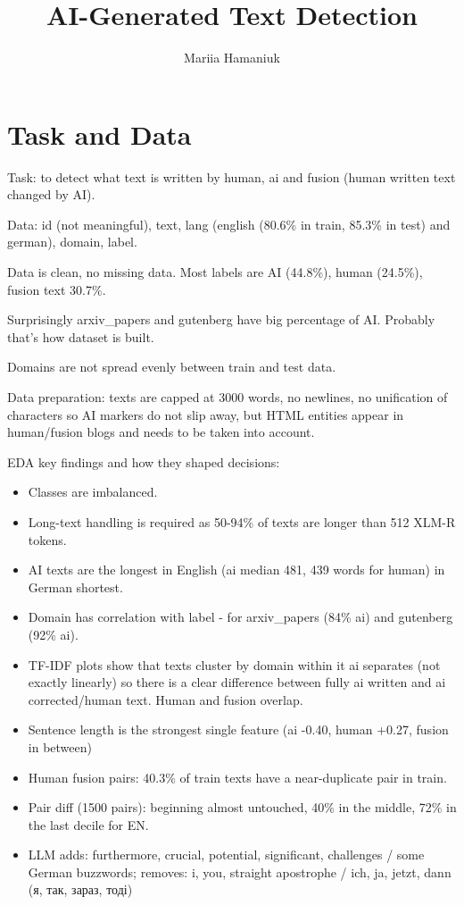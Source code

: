 \documentclass[10pt,a4paper]{article}
\title{AI-Generated Text Detection}
\author{Mariia Hamaniuk}
\date{}
\begin{document}
\maketitle
\vspace{-2em}

\section{Task and Data}
Task: to detect what text is written by human, ai and fusion (human written text changed by AI). 

Data: id (not meaningful), text, lang (english (80.6\% in train, 85.3\% in test) and german), domain, label.

Data is clean, no missing data. Most labels are AI (44.8\%), human (24.5\%), fusion text 30.7\%. 

Surprisingly arxiv\_papers and gutenberg have big percentage of AI. Probably that's how dataset is built.

Domains are not spread evenly between train and test data.

Data preparation: texts are capped at 3000 words, no newlines, no unification of characters so AI markers 
do not slip away, but HTML entities appear in human/fusion blogs and needs to be taken into account.

EDA key findings and how they shaped decisions:

\begin{itemize}
  \item Classes are imbalanced. 
  \item Long-text handling is required as 50-94\% of texts are longer than 512 XLM-R tokens.
  \item AI texts are the longest in English (ai median 481, 439 words for human) in German shortest.
  \item Domain has correlation with label - for arxiv\_papers (84\% ai) and gutenberg (92\% ai). 
  \item TF-IDF plots show that texts cluster by domain within it ai separates (not exactly linearly) 
  so there is a clear difference between fully ai written and ai corrected/human text.
  Human and fusion overlap.
  \item Sentence length is the strongest single feature (ai -0.40, human +0.27, fusion in between)
  \item Human fusion pairs: 40.3\% of train texts have a near-duplicate pair in train.
  \item Pair diff (1500 pairs): beginning almost untouched, 40\% in the middle, 72\% in the last 
  decile for EN.
  \item LLM adds: furthermore, crucial, potential, significant, challenges / some German buzzwords; removes: i, you, straight apostrophe / ich, ja, jetzt, dann ({\selectfont я, так, зараз, тоді})
\end{itemize}
\end{document}
